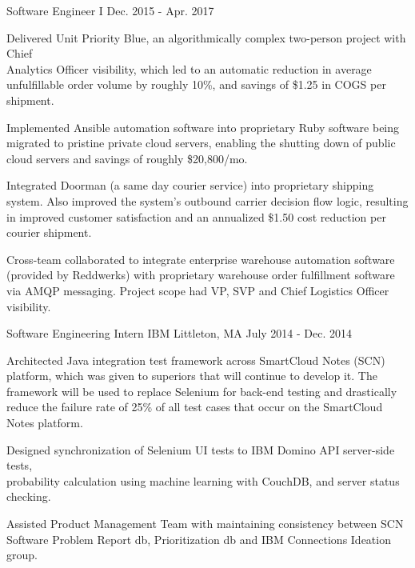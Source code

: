 \begin{cventries}
  \cventry
    {Software Engineer I} %
    {} %
    {} %
    {Dec. 2015 - Apr. 2017} %
    {
      \begin{cvitems} %
        \item {Delivered Unit Priority Blue, an algorithmically complex two-person project with Chief \\Analytics Officer visibility, which led to an automatic reduction in average unfulfillable order volume by roughly 10\%, and savings of \$1.25 in COGS per shipment.}
        \item {Implemented Ansible automation software into proprietary Ruby software being migrated to pristine private cloud servers, enabling the shutting down of public cloud servers and savings of roughly \$20,800/mo.}
        \item {Integrated Doorman (a same day courier service) into proprietary shipping system. Also improved the system's outbound carrier decision flow logic, resulting in improved customer satisfaction and an annualized \$1.50 cost reduction per courier shipment.}
        \item {Cross-team collaborated to integrate enterprise warehouse automation software (provided by Reddwerks) with proprietary warehouse order fulfillment software via AMQP messaging. Project scope had VP, SVP and Chief Logistics Officer visibility.}
      \end{cvitems}
    }

\vspace{5mm}
  \cventry
    {Software Engineering Intern} %
    {IBM} %
    {Littleton, MA} %
    {July 2014 - Dec. 2014} %
    {
      \begin{cvitems} %
        \item {Architected Java integration test framework across SmartCloud Notes (SCN) platform, which was given to superiors that will continue to develop it. The framework will be used to replace Selenium for back-end testing and drastically reduce the failure rate of 25\% of all test cases that occur on the SmartCloud Notes platform.}
        \item {Designed synchronization of Selenium UI tests to IBM Domino API server-side tests, \\probability calculation using machine learning with CouchDB, and server status checking.}
        \item {Assisted Product Management Team with maintaining consistency between SCN Software Problem Report db, Prioritization db and IBM Connections Ideation group.}
      \end{cvitems}
    }


\end{cventries}
